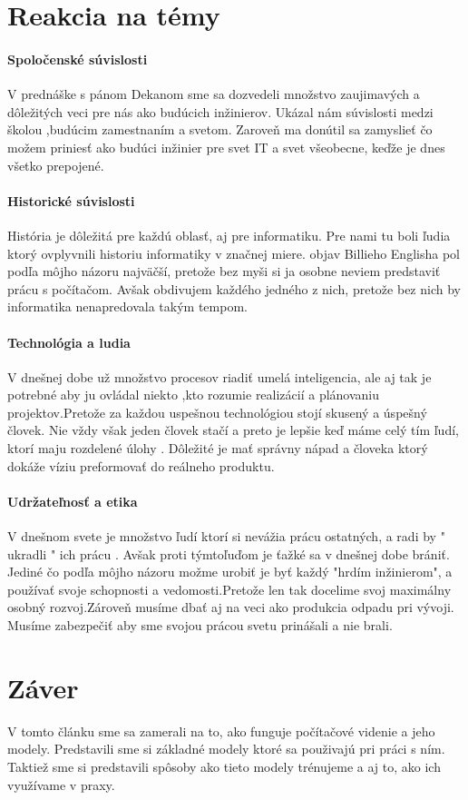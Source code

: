 \documentclass[10pt,twoside,slovak,a4paper]{article}
\begin{document}
\section{Reakcia na témy}
\paragraph{Spoločenské súvislosti}
V prednáške s pánom Dekanom sme sa dozvedeli množstvo zaujimavých a dôležitých veci pre nás ako budúcich inžinierov. Ukázal nám súvislosti medzi školou ,budúcim zamestnaním a svetom. Zaroveň ma donútil sa zamyslieť čo možem priniesť ako budúci inžinier pre svet IT a svet všeobecne, keďže je dnes všetko prepojené.
\paragraph{Historické súvislosti}
História je dôležitá pre každú oblasť, aj pre informatiku. Pre nami tu boli ľudia ktorý ovplyvnili historiu informatiky v značnej miere. objav Billieho Englisha pol podľa môjho názoru najväčší, pretože bez myši si ja osobne neviem predstaviť prácu s počítačom. Avšak obdivujem každého jedného z nich, pretože bez nich by informatika nenapredovala takým tempom.
\paragraph{Technológia a ludia}
V dnešnej dobe už množstvo procesov riadiť umelá inteligencia, ale aj tak je potrebné aby ju ovládal niekto ,kto rozumie realizácií a plánovaniu projektov.Pretože za každou uspešnou technológiou stojí skusený a úspešný človek. Nie vždy však jeden človek stačí a preto je lepšie keď máme celý tím ľudí, ktorí maju rozdelené úlohy . Dôležité je mať správny nápad a človeka ktorý dokáže víziu preformovať do reálneho produktu.
\paragraph{Udržateľnosť a etika}
V dnešnom svete je množstvo ľudí ktorí si nevážia prácu ostatných, a radi by " ukradli " ich prácu . Avšak proti týmtoľuďom je ťažké sa v dnešnej dobe brániť. Jediné čo podľa môjho názoru možme urobiť je byť každý "hrdím inžinierom", a používať svoje schopnosti a vedomosti.Pretože len tak docelime svoj maximálny osobný rozvoj.Zároveň musíme dbať aj na veci ako produkcia odpadu pri vývoji. Musíme zabezpečiť aby sme svojou prácou svetu prinášali a nie brali.

\section{Záver} \label{zaver} %
V tomto článku sme sa zamerali na to, ako funguje počítačové videnie a jeho modely. Predstavili sme si základné modely ktoré sa použivajú pri práci s ním. Taktiež sme si predstavili spôsoby ako tieto modely trénujeme a aj to, ako ich využívame v praxy.





\end{document}
